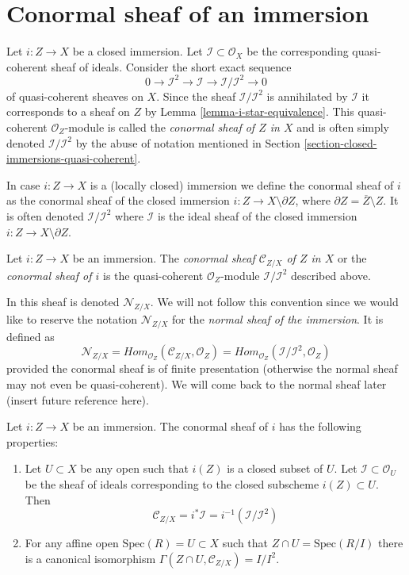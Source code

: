\section{Conormal sheaf of an immersion}
\label{section-conormal-sheaf}

\noindent
Let $i : Z \to X$ be a closed immersion. Let
$\mathcal{I} \subset \mathcal{O}_X$ be the corresponding quasi-coherent
sheaf of ideals. Consider the short exact sequence
$$
0 \to \mathcal{I}^2 \to \mathcal{I} \to \mathcal{I}/\mathcal{I}^2 \to 0
$$
of quasi-coherent sheaves on $X$. Since the sheaf $\mathcal{I}/\mathcal{I}^2$
is annihilated by $\mathcal{I}$ it corresponds to a sheaf on $Z$ by
Lemma \ref{lemma-i-star-equivalence}. This quasi-coherent
$\mathcal{O}_Z$-module is called the {\it conormal sheaf of $Z$ in $X$}
and is often simply denoted
$\mathcal{I}/\mathcal{I}^2$ by the abuse of notation mentioned in
Section \ref{section-closed-immersions-quasi-coherent}.

\medskip\noindent
In case $i : Z \to X$ is a (locally closed) immersion we define the
conormal sheaf of $i$ as the conormal sheaf of the closed
immersion $i : Z \to X \setminus \partial Z$, where
$\partial Z = \overline{Z} \setminus Z$. It is often denoted
$\mathcal{I}/\mathcal{I}^2$ where $\mathcal{I}$ is the ideal sheaf
of the closed immersion $i : Z \to X \setminus \partial Z$.

\begin{definition}
\label{definition-conormal-sheaf}
Let $i : Z \to X$ be an immersion. The {\it conormal sheaf
$\mathcal{C}_{Z/X}$ of $Z$ in $X$} or the {\it conormal sheaf of $i$}
is the quasi-coherent $\mathcal{O}_Z$-module $\mathcal{I}/\mathcal{I}^2$
described above.
\end{definition}

\noindent
In \cite[IV Definition 16.1.2]{EGA} this sheaf is denoted
$\mathcal{N}_{Z/X}$. We will not follow this convention since we would
like to reserve the notation $\mathcal{N}_{Z/X}$
for the {\it normal sheaf of the immersion}. It is defined as
$$
\mathcal{N}_{Z/X} =
\textit{Hom}_{\mathcal{O}_Z}(\mathcal{C}_{Z/X}, \mathcal{O}_Z) =
\textit{Hom}_{\mathcal{O}_Z}(\mathcal{I}/\mathcal{I}^2, \mathcal{O}_Z)
$$
provided the conormal sheaf is of finite presentation (otherwise the
normal sheaf may not even be quasi-coherent). We will come back to the
normal sheaf later (insert future reference here).

\begin{lemma}
\label{lemma-affine-conormal}
Let $i : Z \to X$ be an immersion. The conormal sheaf
of $i$ has the following properties:
\begin{enumerate}
\item Let $U \subset X$ be any open such that $i(Z)$ is
a closed subset of $U$. Let $\mathcal{I} \subset \mathcal{O}_U$
be the sheaf of ideals corresponding to the closed subscheme
$i(Z) \subset U$. Then
$$
\mathcal{C}_{Z/X} = i^*\mathcal{I} = i^{-1}(\mathcal{I}/\mathcal{I}^2)
$$
\item
For any affine open $\text{Spec}(R) = U \subset X$
such that $Z \cap U = \text{Spec}(R/I)$ there is a
canonical isomorphism
$\Gamma(Z \cap U, \mathcal{C}_{Z/X}) = I/I^2$.
\end{enumerate}
\end{lemma}

